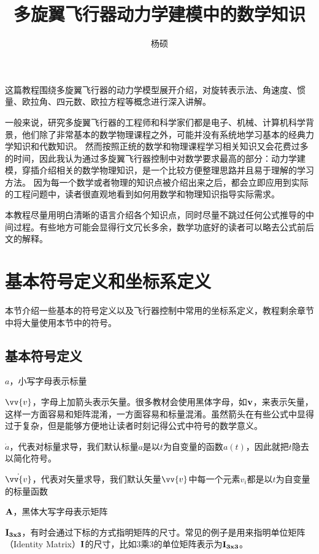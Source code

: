 \documentclass[11pt]{article}
\begin{document}
\title{多旋翼飞行器动力学建模中的数学知识}
\author{杨硕}

\maketitle
这篇教程围绕多旋翼飞行器的动力学模型展开介绍，对旋转表示法、角速度、惯量、欧拉角、四元数、欧拉方程等概念进行深入讲解。

一般来说，研究多旋翼飞行器的工程师和科学家们都是电子、机械、计算机科学背景，他们除了非常基本的数学物理课程之外，可能并没有系统地学习基本的经典力学知识和代数知识。
然而按照正统的数学和物理课程学习相关知识又会花费过多的时间，因此我认为通过多旋翼飞行器控制中对数学要求最高的部分：动力学建模，穿插介绍相关的数学物理知识，是一个比较方便整理思路并且易于理解的学习方法。
因为每一个数学或者物理的知识点被介绍出来之后，都会立即应用到实际的工程问题中，读者很直观地看到如何用数学和物理知识指导实际需求。

本教程尽量用明白清晰的语言介绍各个知识点，同时尽量不跳过任何公式推导的中间过程。有些地方可能会显得行文冗长多余，数学功底好的读者可以略去公式前后文的解释。

\section{基本符号定义和坐标系定义}
本节介绍一些基本的符号定义以及飞行器控制中常用的坐标系定义，教程剩余章节中将大量使用本节中的符号。
\subsection{基本符号定义}
$a$，小写字母表示标量

$\vv{v}$，字母上加箭头表示矢量。很多教材会使用黑体字母，如$\bf{v}$，来表示矢量，这样一方面容易和矩阵混淆，一方面容易和标量混淆。虽然箭头在有些公式中显得过于复杂，但是能够方便地让读者时刻记得公式中符号的数学意义。

$\dot{a}$，代表对标量求导，我们默认标量$a$是以$t$为自变量的函数$a(t)$，因此就把$t$隐去以简化符号。

$\dot{\vv{v}}$，代表对矢量求导，我们默认矢量$\vv{v}$中每一个元素$v_i$都是以$t$为自变量的标量函数

$\bf{A}$，黑体大写字母表示矩阵

$\bf{I}_{3x3}$，有时会通过下标的方式指明矩阵的尺寸。常见的例子是用来指明单位矩阵（Identity Matrix）$\bf{I}$的尺寸，比如3乘3的单位矩阵表示为$\bf{I}_{3x3}$。
\end{document}
